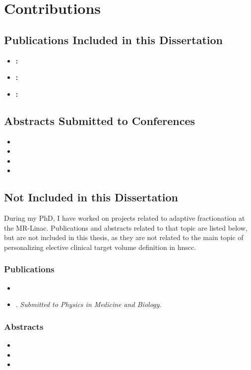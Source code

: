 \documentclass[\relativeRoot/main.tex]{subfiles}
\begin{document}
\chapter*{Contributions}
\section*{Publications Included in this Dissertation}
\begin{itemize}
    \item \textbf{:} 
    \item \textbf{:} 
    \item \textbf{:} 
\end{itemize}

\section*{Abstracts Submitted to Conferences}
\begin{itemize}
    \item {}
    \item {}
    \item {}
    \item {}
\end{itemize}

\section*{Not Included in this Dissertation}

During my PhD, I have worked on projects related to adaptive fractionation at the MR-Linac. Publications and abstracts related to that topic are listed below, but are not included in this thesis, as they are not related to the main topic of personalizing elective clinical target volume definition in \gls{hnscc}.

\subsection*{Publications}
\begin{itemize}
    \item {}
    \item {}. \emph{Submitted to Physics in Medicine and Biology}.
\end{itemize}

\subsection*{Abstracts}
\begin{itemize}
    \item {}
    \item {}
    \item {}
\end{itemize}

\tableofcontents
\end{document}
